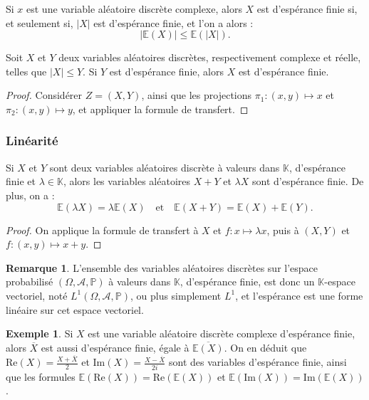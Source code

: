\documentclass[french]{article}
\renewcommand{\P}{\mathbb{P}}
\newcommand{\K}{\mathbb{K}}
\newcommand{\E}{\mathbb{E}}
\theoremstyle{plain}
\theoremstyle{definition}
\newtheorem*{ex}{Exemple}
\newtheorem*{rmq}{Remarque}
\theoremstyle{remark}
\begin{document}
\begin{prop}%
	Si $x$ est une variable aléatoire discrète complexe, alors $X$ est d'espérance finie si, et seulement si, $\lvert X\rvert$ est d'espérance finie, et l'on a alors :
	$$\lvert\E(X)\rvert\leqslant\E(\lvert X\rvert).$$
\end{prop}

\begin{prop}%
	Soit $X$ et $Y$ deux variables aléatoires discrètes, respectivement complexe et réelle, telles que $\lvert X\rvert\leqslant Y$. Si $Y$ est d'espérance finie, alors $X$ est d'espérance finie.
\end{prop}
\begin{proof}
	Considérer $Z=(X,Y)$, ainsi que les projections $\pi_1:(x,y)\mapsto x$ et $\pi_2:(x,y)\mapsto y$, et appliquer la formule de transfert.
\end{proof}

\subsubsection*{Linéarité}

\begin{thm}%
	Si $X$ et $Y$ sont deux variables aléatoires discrète à valeurs dans $\K$, d'espérance finie et $\lambda\in\K$, alors les variables aléatoires $X+Y$ et $\lambda X$ sont d'espérance finie. De plus, on a :
	$$\E(\lambda X)=\lambda\E(X)\quad\text{et}\quad\E(X+Y)=\E(X)+\E(Y).$$
\end{thm}
\begin{proof}
	On applique la formule de transfert à $X$ et $f:x\mapsto\lambda x$, puis à $(X,Y)$ et $f:(x,y)\mapsto x+y$.
\end{proof}

\begin{rmq}
	L'ensemble des variables aléatoires discrètes sur l'espace probabilisé $(\Omega,\mathcal{A},\P)$ à valeurs dans $\K$, d'espérance finie, est donc un $\K$-espace vectoriel, noté $L^1(\Omega,\mathcal{A},\P)$, ou plus simplement $L^1$, et l'espérance est une forme linéaire sur cet espace vectoriel.
\end{rmq}

\begin{ex}
	Si $X$ est une variable aléatoire discrète complexe d'espérance finie, alors $\overline{X}$ est aussi d'espérance finie, égale à $\overline{\E(X)}$. On en déduit que $\text{Re}(X)=\displaystyle\frac{X+\overline{X}}{2}$ et $\text{Im}(X)=\displaystyle\frac{X-\overline{X}}{2i}$ sont des variables d'espérance finie, ainsi que les formules $\E(\text{Re}(X))=\text{Re}(\E(X))$ et $\E(\text{Im}(X))=\text{Im}(\E(X))$.
\end{ex}
\end{document}
